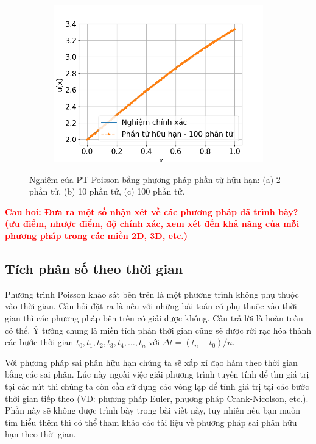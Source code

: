\begin{figure}[htbp]
\begin{subfigure}[b]{0.3\linewidth}
        \caption{}
        \label{fig:PTHH_10el}
    \end{subfigure}\hfill
    \begin{subfigure}[b]{0.3\linewidth}
        \centering
        \includegraphics[width=\linewidth]{Tuan6/figure/PTHH_100el.png}
        \caption{}
        \label{fig:PTHH_100el}
    \end{subfigure}
    \caption{Nghiệm của PT Poisson bằng phương pháp phần tử hữu hạn: (a) 2 phần tử, (b) 10 phần tử, (c) 100 phần tử.}
    \label{fig_PTHHresults}
\end{figure}

\textbf{\textcolor{red}{Cau hoi: Đưa ra một số nhận xét về các phương pháp đã trình bày? (ưu điểm, nhược điểm, độ chính xác, xem xét đến khả năng của mỗi phương pháp trong các miền 2D, 3D, etc.)}}

\subsection{Tích phân số theo thời gian}

Phương trình Poisson khảo sát bên trên là một phương trình không phụ thuộc vào thời gian. Câu hỏi đặt ra là nếu với những bài toán có phụ thuộc vào thời gian thì các phương pháp bên trên có giải được không. Câu trả lời là hoàn toàn có thể. Ý tưởng chung là miền tích phân thời gian cũng sẽ được rời rạc hóa thành các bước thời gian $t_0, t_1, t_2, t_3, t_4, \dots, t_n$ với $\Delta t = (t_n-t_0)/n$.

Với phương pháp sai phân hữu hạn chúng ta sẽ xấp xỉ đạo hàm theo thời gian bằng các sai phân. Lúc này ngoài việc giải phương trình tuyến tính để tìm giá trị tại các nút thì chúng ta còn cần sử dụng các vòng lặp để tính giá trị tại các bước thời gian tiếp theo (VD: phương pháp Euler, phương pháp Crank-Nicolson, etc.). Phần này sẽ không được trình bày trong bài viết này, tuy nhiên nếu bạn muốn tìm hiểu thêm thì có thể tham khảo các tài liệu về phương pháp sai phân hữu hạn theo thời gian.

